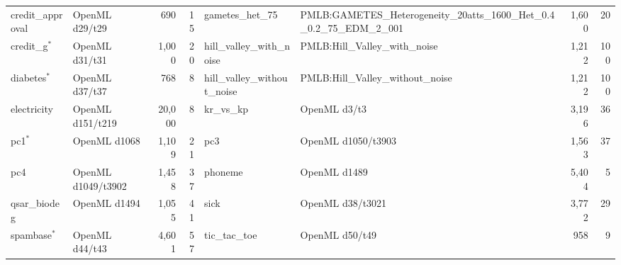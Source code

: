 \documentclass[conference]{IEEEtran}
\begin{document}
\begin{table}[!b]
{\begin{tabular}{@{}llrrllrr@{}}
credit\_approval & OpenML d29/t29 & 690 & 15 &
gametes\_het\_75 & PMLB:GAMETES\_Heterogeneity\_20atts\_1600\_Het\_0.4\_0.2\_75\_EDM\_2\_001 & 1{,}600 & 20 \\
credit\_g$^*$ & OpenML d31/t31 & 1{,}000 & 20 &
hill\_valley\_with\_noise & PMLB:Hill\_Valley\_with\_noise & 1{,}212 & 100 \\
diabetes$^*$ & OpenML d37/t37 & 768 & 8 &
hill\_valley\_without\_noise & PMLB:Hill\_Valley\_without\_noise & 1{,}212 & 100 \\
electricity & OpenML d151/t219 & 20{,}000 & 8 &
kr\_vs\_kp & OpenML d3/t3 & 3{,}196 & 36 \\
pc1$^*$ & OpenML d1068 & 1{,}109 & 21 &
pc3 & OpenML d1050/t3903 & 1{,}563 & 37 \\
pc4 & OpenML d1049/t3902 & 1{,}458 & 37 &
phoneme & OpenML d1489 & 5{,}404 & 5 \\
qsar\_biodeg & OpenML d1494 & 1{,}055 & 41 &
sick & OpenML d38/t3021 & 3{,}772 & 29 \\
spambase$^*$ & OpenML d44/t43 & 4{,}601 & 57 &
tic\_tac\_toe & OpenML d50/t49 & 958 & 9 \\
\bottomrule
\end{tabular}
}
\end{table}

\begingroup
\footnotesize


\endgroup
\end{document}

